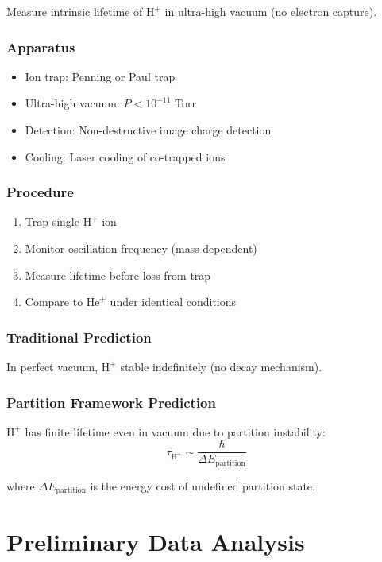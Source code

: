 \documentclass[12pt,a4paper]{article}
\begin{document}
Measure intrinsic lifetime of $\text{H}^+$ in ultra-high vacuum (no electron capture).

\subsubsection{Apparatus}

\begin{itemize}
\item Ion trap: Penning or Paul trap
\item Ultra-high vacuum: $P < 10^{-11}$ Torr
\item Detection: Non-destructive image charge detection
\item Cooling: Laser cooling of co-trapped ions
\end{itemize}

\subsubsection{Procedure}

\begin{enumerate}
\item Trap single $\text{H}^+$ ion
\item Monitor oscillation frequency (mass-dependent)
\item Measure lifetime before loss from trap
\item Compare to $\text{He}^+$ under identical conditions
\end{enumerate}

\subsubsection{Traditional Prediction}

In perfect vacuum, $\text{H}^+$ stable indefinitely (no decay mechanism).

\subsubsection{Partition Framework Prediction}

$\text{H}^+$ has finite lifetime even in vacuum due to partition instability:
$$
\tau_{\text{H}^+} \sim \frac{\hbar}{\Delta E_{\text{partition}}}
$$

where $\Delta E_{\text{partition}}$ is the energy cost of undefined partition state.

\section{Preliminary Data Analysis}
\end{document}
